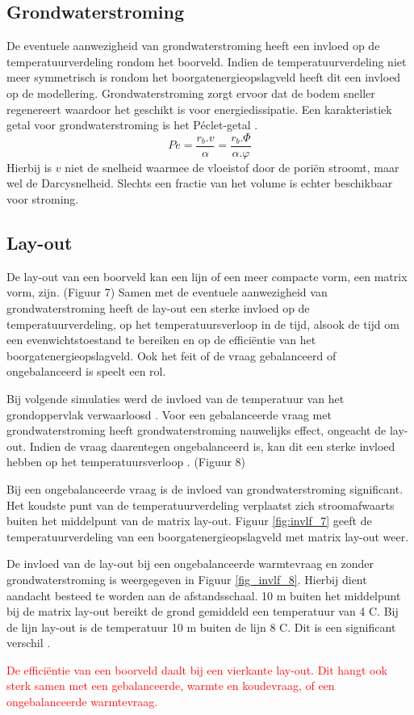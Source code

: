 \documentclass[a4paper,oneside,11pt]{report}
\numberwithin{figure}{section}
\numberwithin{table}{section}
\numberwithin{equation}{section}
\begin{document}
\subsection*{Grondwaterstroming}
De eventuele aanwezigheid van grondwaterstroming heeft een invloed op de temperatuurverdeling rondom het boorveld. Indien de temperatuurverdeling niet meer symmetrisch is rondom het boorgatenergieopslagveld heeft dit een invloed op de modellering. Grondwaterstroming zorgt ervoor dat de bodem sneller regenereert waardoor het geschikt is voor energiedissipatie.
Een karakteristiek getal voor grondwaterstroming is het P\'eclet-getal \cite{}. 
\begin{equation} \label{invlf_eq2}
Pe=\dfrac{r_b.v}{\alpha}=\dfrac{r_b.\Phi}{\alpha.\varphi}
\end{equation}
Hierbij is $v$ niet de snelheid waarmee de vloeistof door de pori\"en stroomt, maar wel de Darcysnelheid. Slechts een fractie van het volume is echter beschikbaar voor stroming. 

\subsection*{Lay-out}
De lay-out van een boorveld kan een lijn of een meer compacte vorm, een matrix vorm, zijn. (Figuur 7) Samen met de eventuele aanwezigheid van grondwaterstroming heeft de lay-out een sterke invloed op de temperatuurverdeling, op het temperatuursverloop in de tijd, alsook de tijd om een evenwichtstoestand te bereiken en op de effici\"entie van het boorgatenergieopslagveld. Ook het feit of de vraag gebalanceerd of ongebalanceerd is speelt een rol.
\par Bij volgende simulaties werd de invloed van de temperatuur van het grondoppervlak verwaarloosd \cite{R10}. Voor een gebalanceerde vraag met grondwaterstroming heeft grondwaterstroming nauwelijks effect, ongeacht de lay-out. Indien de vraag daarentegen ongebalanceerd is, kan dit een sterke invloed hebben op het temperatuursverloop \cite{R10}. (Figuur 8)
\par Bij een ongebalanceerde vraag is de invloed van grondwaterstroming significant. Het koudste punt van de temperatuurverdeling verplaatst zich stroomafwaarts buiten het middelpunt van de matrix lay-out. Figuur \ref{fig:invlf_7} geeft de temperatuurverdeling van een boorgatenergieopslagveld met matrix lay-out weer\cite{R10}. 
\par De invloed van de lay-out bij een ongebalanceerde warmtevraag en zonder grondwaterstroming is weergegeven in Figuur \ref{fig_invlf_8}. Hierbij dient aandacht besteed te worden aan de afstandsschaal. 10 m buiten het middelpunt bij de matrix lay-out bereikt de grond gemiddeld een temperatuur van 4 \degree C. Bij de lijn lay-out is de temperatuur 10 m buiten de lijn 8 \degree C. Dit is een significant verschil \cite{R10}.
\par \textcolor{red}{De effici\"entie van een boorveld daalt bij een vierkante lay-out. Dit hangt ook sterk samen met een gebalanceerde, warmte en koudevraag, of een ongebalanceerde warmtevraag. }
\end{document}
